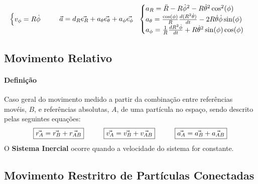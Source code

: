 \documentclass{article}
\begin{document}
\begin{enumerate}[noitemsep]
\[\begin{cases}
                                v_{\phi} = R\dot{\phi}\\
                            \end{cases}
                            \hspace{5mm}
                            \vec{a} = d_{R}\vec{e_{R}} + a_{\theta}\vec{e_{\theta}} + a_{\phi}\vec{e_{\phi}}
                            \hspace{2.5mm}
                            \begin{cases}
                                a_{R} = \ddot{R} - R\dot{\phi}^{2} - R\dot{\theta}^{2}\cos^{2}(\phi)\\
                                a_{\theta} = \frac{\cos(\phi)}{R} \frac{d(R^{2} \dot{\theta})}{dt} - 2R\dot{\theta}\dot{\phi}\sin(\phi)\\
                                a_{\phi} = \frac{1}{R} \frac{dR^{2}\dot{\phi}}{dt} + R\dot{\theta}^{2}\sin(\phi)\cos(\phi)\\
                            \end{cases}
                        \]
                \end{enumerate}

        \subsection{Movimento Relativo}
            \paragraph{Definição}Caso geral do movimento medido a partir da combinação entre referências movéis, $B$, e referências absolutas, $A$, de uma partícula no espaço, sendo descrito pelas seguintes equações: 
                \begin{equation}
                    \boxed{
                        \vec{r_{A}} = \vec{r_{B}} + \vec{r_{AB}}
                    }
                    \hspace{10mm}
                    \boxed{
                        \vec{v_{A}} = \vec{v_{B}} + \vec{v_{AB}}
                    }
                    \hspace{10mm}
                    \boxed{
                        \vec{a_{A}} = \vec{a_{B}} + \vec{a_{AB}}
                    }
                \end{equation}
            O \textbf{Sistema Inercial} ocorre quando a velocidade do sistema for constante.

        \subsection{Movimento Restritro de Partículas Conectadas}
\end{document}
